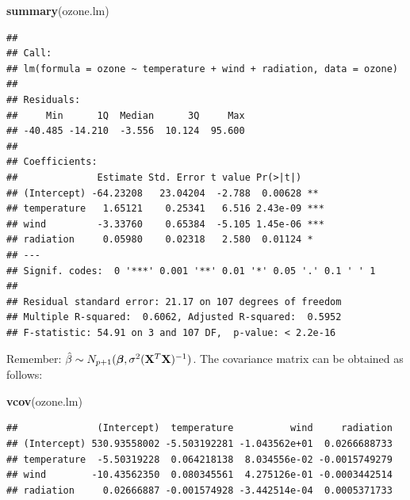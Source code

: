 \documentclass[10pt,ignorenonframetext,]{beamer}
\newenvironment{Shaded}{\begin{snugshade}}{\end{snugshade}}
\newcommand{\KeywordTok}[1]{\textcolor[rgb]{0.13,0.29,0.53}{\textbf{#1}}}
\newcommand{\NormalTok}[1]{#1}
\begin{document}
\begin{frame}[fragile]

\footnotesize

\begin{Shaded}
\begin{Highlighting}[]
\KeywordTok{summary}\NormalTok{(ozone.lm)}
\end{Highlighting}
\end{Shaded}

\begin{verbatim}
## 
## Call:
## lm(formula = ozone ~ temperature + wind + radiation, data = ozone)
## 
## Residuals:
##     Min      1Q  Median      3Q     Max 
## -40.485 -14.210  -3.556  10.124  95.600 
## 
## Coefficients:
##              Estimate Std. Error t value Pr(>|t|)    
## (Intercept) -64.23208   23.04204  -2.788  0.00628 ** 
## temperature   1.65121    0.25341   6.516 2.43e-09 ***
## wind         -3.33760    0.65384  -5.105 1.45e-06 ***
## radiation     0.05980    0.02318   2.580  0.01124 *  
## ---
## Signif. codes:  0 '***' 0.001 '**' 0.01 '*' 0.05 '.' 0.1 ' ' 1
## 
## Residual standard error: 21.17 on 107 degrees of freedom
## Multiple R-squared:  0.6062, Adjusted R-squared:  0.5952 
## F-statistic: 54.91 on 3 and 107 DF,  p-value: < 2.2e-16
\end{verbatim}

\normalsize

\end{frame}

\begin{frame}[fragile]

Remember:
\(\hat{\beta}\sim N_{p+1}(\boldsymbol{\beta},\sigma^2({\bf X}^T{\bf X})^{-1})\).
The covariance matrix can be obtained as follows:

\footnotesize

\begin{Shaded}
\begin{Highlighting}[]
\KeywordTok{vcov}\NormalTok{(ozone.lm)}
\end{Highlighting}
\end{Shaded}

\begin{verbatim}
##              (Intercept)  temperature          wind     radiation
## (Intercept) 530.93558002 -5.503192281 -1.043562e+01  0.0266688733
## temperature  -5.50319228  0.064218138  8.034556e-02 -0.0015749279
## wind        -10.43562350  0.080345561  4.275126e-01 -0.0003442514
## radiation     0.02666887 -0.001574928 -3.442514e-04  0.0005371733
\end{verbatim}

\end{frame}
\end{document}
